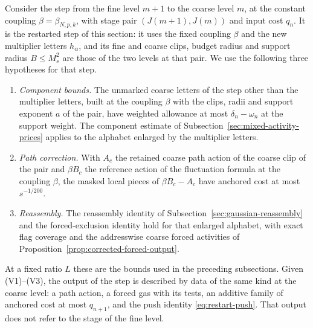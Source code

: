 Consider the step from the fine level $m+1$ to the coarse level $m$, at the
constant coupling $\beta=\beta_{N,p,k}$, with stage pair
$(J(m+1),J(m))$ and input cost $q_n$. It is the restarted step of this
section: it uses the fixed coupling $\beta$ and the new multiplier letters
$h_\alpha$, and its fine and coarse clips, budget radius and support
radius $B\le M_s^2$ are those of the two levels at that pair. We use the
following three hypotheses for that step.
\begin{enumerate}
\item[(V1)] \emph{Component bounds.} The unmarked coarse letters of the
 step other than the multiplier letters, built at the coupling $\beta$
 with the clips, radii and support exponent $a$ of the pair, have weighted
 allowance at most $\delta_n-\omega_n$ at the support weight. The
 component estimate of Subsection~\ref{sec:mixed-activity-prices} applies to
 the alphabet enlarged by the multiplier letters.
\item[(V2)] \emph{Path correction.} With $A_c$ the retained coarse path
 action of the coarse clip of the pair and $\beta B_c$ the reference
 action of the fluctuation formula at the coupling $\beta$, the masked
 local pieces of $\beta B_c-A_c$ have anchored cost at most $s^{-1/200}$.
\item[(V3)] \emph{Reassembly.} The reassembly identity of
 Subsection~\ref{sec:gaussian-reassembly} and the forced-exclusion identity
 hold for that enlarged alphabet, with exact flag coverage and the
 addresswise coarse forced activities of
 Proposition~\ref{prop:corrected-forced-output}.
\end{enumerate}
At a fixed ratio $L$ these are the bounds used in the preceding
subsections. Given (V1)--(V3), the output of the step is described by data
of the same kind at the coarse level: a path action, a forced gas with its
tests, an additive family of anchored cost at most $q_{n+1}$, and the push
identity \eqref{eq:restart-push}. That output does not refer to the stage
of the fine level.

